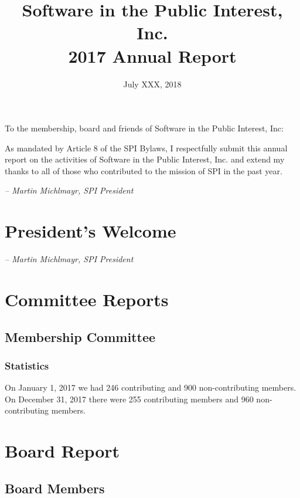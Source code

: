 \documentclass[a4paper]{report}
\begin{document}
\title{Software in the Public Interest, Inc.\\
2017 Annual Report}
\date{July XXX, 2018}

\maketitle

To the membership, board and friends of Software in the Public Interest, Inc:

As mandated by Article 8 of the SPI Bylaws, I respectfully submit this annual
report on the activities of Software in the Public Interest, Inc. and extend my
thanks to all of those who contributed to the mission of SPI in the past year.

  \emph{-- Martin Michlmayr, SPI President}

\newpage

\tableofcontents

\newpage

\chapter{President's Welcome}
\label{sec:president}

  \emph{-- Martin Michlmayr, SPI President}

\chapter{Committee Reports}
\section{Membership Committee}

\subsection{Statistics}

On January 1, 2017 we had 246 contributing and 900 non-contributing
members.  On December 31, 2017 there were 255 contributing members and
960 non-contributing members.

\chapter{Board Report}
\section{Board Members}
\end{document}
